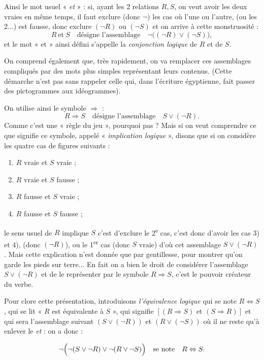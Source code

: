 Ainsi le mot usuel « \emph{et} » : si, ayant les 2 relations $R,S$, on veut avoir les deux vraies en même temps, il faut exclure (donc $\neg$) les cas où l'une ou l'autre, (ou les 2...) est fausse, donc exclure $(\neg R)$ ou $(\neg S)$ et on arrive à cette monstruosité :
\[
R\ \text{et}\ S \quad\text{désigne l'assemblage}\quad \neg\bigl((\neg R)\lor(\neg S)\bigr),
\]
et le mot « et » ainsi défini s'appelle la \emph{conjonction logique} de $R$ et de $S$.

On comprend également que, très rapidement, on va remplacer ces assemblages compliqués par des mots plus simples représentant leurs contenus. (Cette démarche n'est pas sans rappeler celle qui, dans l'écriture égyptienne, fait passer des pictogrammes aux idéogrammes).

On utilise ainsi le symbole $\Rightarrow$ :
\[
R\Rightarrow S \quad\text{désigne l'assemblage}\quad S\lor(\neg R).
\]
Comme c'est une « règle du jeu », pourquoi pas ? Mais si on veut comprendre ce que signifie ce symbole, appelé « \emph{implication logique} », disons que si on considère les quatre cas de figures suivants :
\begin{enumerate}[label=\arabic*)]
\item $R$ vraie et $S$ vraie ;
\item $R$ vraie et $S$ fausse ;
\item $R$ fausse et $S$ vraie ;
\item $R$ fausse et $S$ fausse ;
\end{enumerate}
le sens usuel de $R$ implique $S$ c'est d'exclure le 2\textsuperscript{e} cas, c'est donc d'avoir les cas 3) et 4), (donc $(\neg R)$), ou le 1\textsuperscript{er} cas (donc $S$ vraie) d'où cet assemblage $S\lor(\neg R)$. Mais cette explication n'est donnée que par gentillesse, pour montrer qu'on garde les pieds sur terre... En fait on a bien le droit de considérer l'assemblage $S\lor(\neg R)$ et de le représenter par le symbole $R\Rightarrow S$, c'est le pouvoir créateur du verbe.

Pour clore cette présentation, introduisons \emph{l'équivalence logique} qui se note $R\Leftrightarrow S$, qui se lit « $R$ est équivalente à $S$ », qui signifie $[(R\Rightarrow S)\text{ et }(S\Rightarrow R)]$ et qui sera l'assemblage suivant $(S\lor(\neg R))$ et $(R\lor(\neg S))$ où il ne reste qu'à enlever le \emph{et} : on a donc :
\begin{logicbox}
\[
\neg\Bigl(\neg(S\lor\neg R)\lor\neg(R\lor\neg S)\Bigr)\quad\text{se note}\quad R\Leftrightarrow S.
\]
\end{logicbox}

